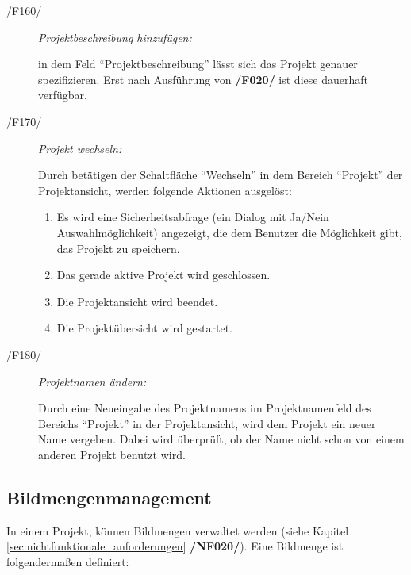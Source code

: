 \begin{description}
\begin{enumerate}
			\end{enumerate}
	
		\item[/F160/] \textit{Projektbeschreibung hinzufügen:}\par in dem Feld "`Projektbeschreibung"' lässt sich das Projekt genauer spezifizieren. Erst nach Ausführung von \textbf{/F020/} ist diese dauerhaft verfügbar.
	
		\item[/F170/] \textit{Projekt wechseln:}\par Durch betätigen der Schaltfläche "`Wechseln"' in dem Bereich "`Projekt"' der Projektansicht, werden folgende Aktionen ausgelöst:
		
		\begin{enumerate}
				
				\item Es wird eine Sicherheitsabfrage (ein Dialog mit Ja/Nein Auswahlmöglichkeit) angezeigt, die dem Benutzer die Möglichkeit gibt, das Projekt zu speichern.
				
				\item Das gerade aktive Projekt wird geschlossen.
				
				\item Die Projektansicht wird beendet.
				
				\item Die Projektübersicht wird gestartet.
			
			\end{enumerate}

		\item[/F180/] \textit{Projektnamen ändern:}\par Durch eine Neueingabe des Projektnamens im Projektnamenfeld des Bereichs "`Projekt"' in der Projektansicht, wird dem Projekt ein neuer Name vergeben. Dabei wird überprüft, ob der Name nicht schon von einem anderen Projekt benutzt wird.
	
	\end{description}

\subsection{Bildmengenmanagement}

\label{subsec:bildmengenmgmt}
	
	In einem Projekt, können Bildmengen verwaltet werden (siehe Kapitel \ref{sec:nichtfunktionale_anforderungen} \textbf{/NF020/}). Eine Bildmenge ist folgendermaßen definiert:
	
